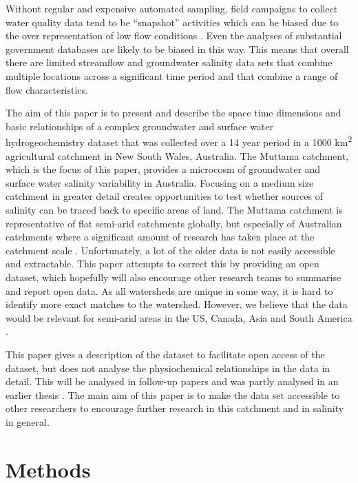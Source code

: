 \documentclass[, manuscript]{copernicus}
\begin{document}
Without regular and expensive automated sampling, field campaigns to
collect water quality data tend to be ``snapshot'' activities
\citep{Grayson1997, Breuer2015, Lyon2008, Cartwright2010, Lintern2018}
which can be biased due to the over representation of low flow
conditions \citep{Lessels2020}. Even the analyses of substantial
government databases \citep{Lintern2018} are likely to be biased in this
way. This means that overall there are limited streamflow and
groundwater salinity data sets that combine multiple locations across a
significant time period and that combine a range of flow
characteristics.

The aim of this paper is to present and describe the space time
dimensions and basic relationships of a complex groundwater and surface
water hydrogeochemistry dataset that was collected over a 14 year period
in a 1000 km\textsuperscript{2} agricultural catchment in New South
Wales, Australia. The Muttama catchment, which is the focus of this
paper, provides a microcosm of groundwater and surface water salinity
variability in Australia. Focusing on a medium size catchment in greater
detail creates opportunities to test whether sources of salinity can be
traced back to specific areas of land. The Muttama catchment is
representative of flat semi-arid catchments globally, but especially of
Australian catchments where a significant amount of research has taken
place at the catchment scale
\citep[e.g.][]{crosbie2007, Hughes2007, hughes2008, Summerell2006}.
Unfortunately, a lot of the older data is not easily accessible and
extractable. This paper attempts to correct this by providing an open
dataset, which hopefully will also encourage other research teams to
summarise and report open data. As all watersheds are unique in some
way, it is hard to identify more exact matches to the watershed.
However, we believe that the data would be relevant for semi-arid areas
in the US, Canada, Asia and South America
\citep{thorslund_vanvliet2020, stavi2021}.

This paper gives a description of the dataset to facilitate open access
of the dataset, but does not analyse the physiochemical relationships in
the data in detail. This will be analysed in follow-up papers and was
partly analysed in an earlier thesis \citep{Akter2018}. The main aim of
this paper is to make the data set accessible to other researchers to
encourage further research in this catchment and in salinity in general.

\section{Methods}
\end{document}

